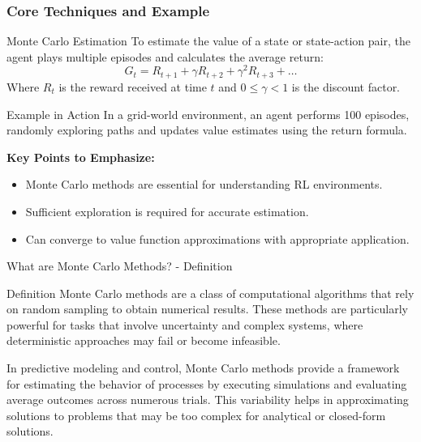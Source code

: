 \documentclass[aspectratio=169]{beamer}
\begin{document}
\begin{frame}[fragile]
    \frametitle{Core Techniques and Example}
    \begin{block}{Monte Carlo Estimation}
        To estimate the value of a state or state-action pair, the agent plays multiple episodes and calculates the average return:
        \begin{equation}
        G_t = R_{t+1} + \gamma R_{t+2} + \gamma^2 R_{t+3} + \ldots
        \end{equation}
        Where \(R_t\) is the reward received at time \(t\) and \(0 \leq \gamma < 1\) is the discount factor.
    \end{block}
    
    \begin{block}{Example in Action}
        In a grid-world environment, an agent performs 100 episodes, randomly exploring paths and updates value estimates using the return formula.
    \end{block}
    
    \textbf{Key Points to Emphasize:}
    \begin{itemize}
        \item Monte Carlo methods are essential for understanding RL environments.
        \item Sufficient exploration is required for accurate estimation.
        \item Can converge to value function approximations with appropriate application.
    \end{itemize}
\end{frame}

\begin{frame}[fragile]{What are Monte Carlo Methods? - Definition}
    \begin{block}{Definition}
        Monte Carlo methods are a class of computational algorithms that rely on random sampling to obtain numerical results. These methods are particularly powerful for tasks that involve uncertainty and complex systems, where deterministic approaches may fail or become infeasible.
    \end{block}

    In predictive modeling and control, Monte Carlo methods provide a framework for estimating the behavior of processes by executing simulations and evaluating average outcomes across numerous trials. This variability helps in approximating solutions to problems that may be too complex for analytical or closed-form solutions.
\end{frame}
\end{document}
